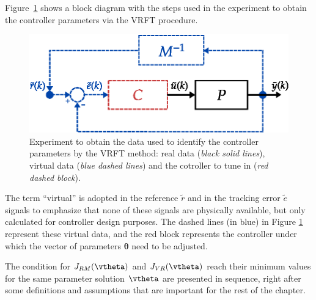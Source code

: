 Figure~\ref{fig:Figs-diagrama_VRFT-eps} shows a block diagram with the steps used in the experiment to obtain the controller parameters via the VRFT procedure.
\begin{figure}[H]
   \centering
   \includegraphics{Figs/diagrama_VRFT_maps.eps}
   \caption{Experiment to obtain the data used to identify the controller parameters by the VRFT method: real data (\textit{black solid lines}), virtual data (\textit{blue dashed lines}) and the cotroller to tune in (\textit{red dashed block}).}
   \label{fig:Figs-diagrama_VRFT-eps}
\end{figure}
The term ``virtual'' is adopted in the reference $\tilde{r}$ and in the tracking error $\tilde{e}$ signals to emphasize that none of these signals are physically available, but only calculated for controller design purposes. 
The dashed lines (in blue) in Figure \ref{fig:Figs-diagrama_VRFT-eps} represent these virtual data, and the red block represents the controller under which the vector of parameters $\bm{\theta}$ need to be adjusted.

The condition for  $J_{RM}(\vtheta)$ and $J_{VR}(\vtheta)$ reach their minimum values for the same parameter solution $\vtheta$ are presented in sequence, right after some definitions and assumptions that are important for the rest of the chapter.

